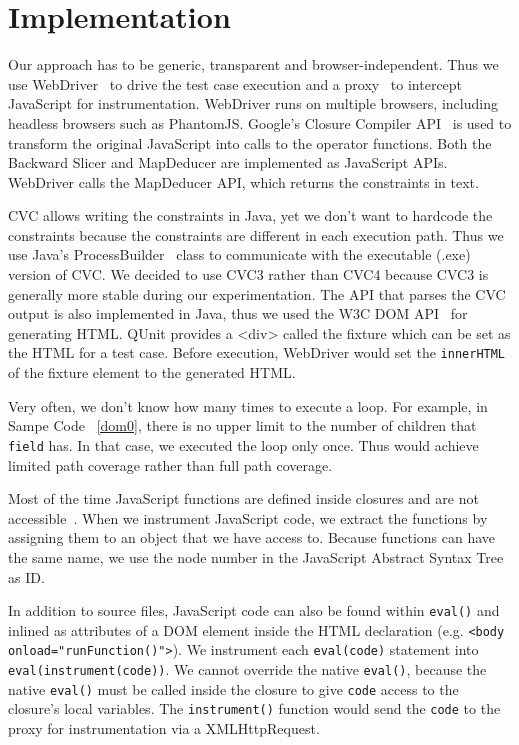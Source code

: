 \section{Implementation}

Our approach has to be generic, transparent and browser-independent.  Thus we use WebDriver~\cite{webdriver} to drive the test case execution and a proxy~\cite{webscarab} to intercept JavaScript for instrumentation.  WebDriver runs on multiple browsers, including headless browsers such as PhantomJS.  
Google's Closure Compiler API~\cite{ClosureCompiler} is used to transform the original JavaScript into calls to the operator functions. 
Both the Backward Slicer and MapDeducer are implemented as JavaScript APIs.  WebDriver calls the MapDeducer API, which returns the constraints in text.  

CVC allows writing the constraints in Java, yet we don't want to hardcode the constraints because the constraints are different in each execution path.  
Thus we use Java's ProcessBuilder~\cite{} class to communicate with the executable (.exe) version of CVC.  We decided to use CVC3 rather than CVC4 because CVC3 is generally more stable during our experimentation.  
The API that parses the CVC output is also implemented in Java, thus we used the W3C DOM API~\cite{DomAPI} for generating HTML.  
QUnit provides a <div> called the fixture which can be set as the HTML for a test case.   Before execution, WebDriver would set the {\tt innerHTML} of the fixture element to the generated HTML.  

Very often, we don't know how many times to execute a loop.  For example, in Sampe Code ~\ref{dom0}, there is no upper limit to the number of children that {\tt field} has.  
In that case, we executed the loop only once.  Thus \tool would achieve limited path coverage rather than full path coverage.  

Most of the time JavaScript functions are defined inside closures and are not accessible~\cite{privatefunctions}.  
When we instrument JavaScript code, we extract the functions by assigning them to an object that we have access to.  Because functions can have the same name, we use the node number in the JavaScript Abstract Syntax Tree as ID.

In addition to source files, JavaScript code can also be found within {\tt eval()} and inlined as attributes of a DOM element inside the HTML declaration (e.g. {\tt <body onload="runFunction()">}).
We instrument each {\tt eval(code)} statement into {\tt eval(instrument(code))}.  We cannot override the native {\tt eval()}, because the native {\tt eval()} must be called inside the closure to give {\tt code} access to the closure's local variables.  
The {\tt instrument()} function would send the {\tt code} to the proxy for instrumentation via a XMLHttpRequest.  

